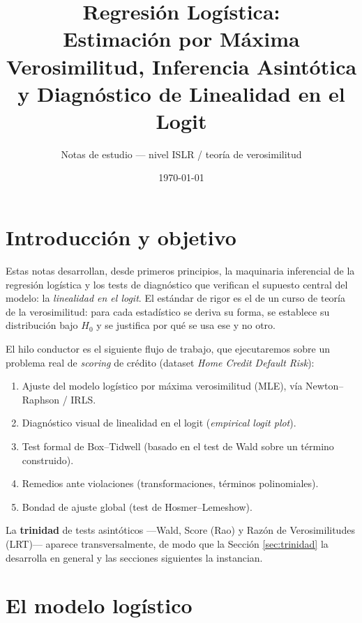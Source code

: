 \documentclass[11pt]{article}
\title{\textbf{Regresión Logística:\\
Estimación por Máxima Verosimilitud, Inferencia Asintótica\\
y Diagnóstico de Linealidad en el Logit}}
\author{Notas de estudio --- nivel ISLR / teoría de verosimilitud}
\date{\today}
\theoremstyle{plain}
\theoremstyle{definition}
\theoremstyle{remark}
\begin{document}
\maketitle
\tableofcontents
\newpage

\section{Introducción y objetivo}

Estas notas desarrollan, desde primeros principios, la maquinaria inferencial
de la regresión logística y los tests de diagnóstico que verifican el supuesto
central del modelo: la \emph{linealidad en el logit}. El estándar de rigor es
el de un curso de teoría de la verosimilitud: para cada estadístico se deriva
su forma, se establece su distribución bajo $H_0$ y se justifica por qué se usa
ese y no otro.

El hilo conductor es el siguiente flujo de trabajo, que ejecutaremos sobre un
problema real de \emph{scoring} de crédito (dataset \emph{Home Credit Default
Risk}):

\begin{enumerate}[label=\textbf{\arabic*.}]
  \item Ajuste del modelo logístico por máxima verosimilitud (MLE), vía
        Newton--Raphson / IRLS.
  \item Diagnóstico visual de linealidad en el logit (\emph{empirical logit
        plot}).
  \item Test formal de Box--Tidwell (basado en el test de Wald sobre un término
        construido).
  \item Remedios ante violaciones (transformaciones, términos polinomiales).
  \item Bondad de ajuste global (test de Hosmer--Lemeshow).
\end{enumerate}

La \textbf{trinidad} de tests asintóticos ---Wald, Score (Rao) y Razón de
Verosimilitudes (LRT)--- aparece transversalmente, de modo que la Sección
\ref{sec:trinidad} la desarrolla en general y las secciones siguientes la
instancian.

\section{El modelo logístico}\label{sec:modelo}
\end{document}

